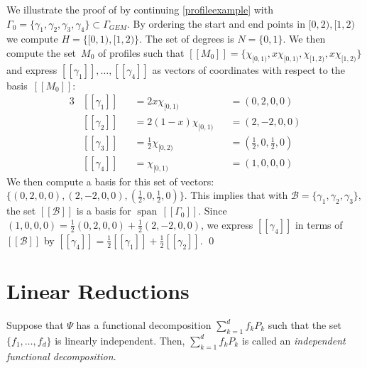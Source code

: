 \documentclass[a4paper,UKenglish,cleveref, autoref,mathscr]{lipics-v2019}
\newcommand{\1}{\mathbbm{1}}
\newcommand{\pl}{\Gamma_{\mathit{GEM}}}
\DeclareMathOperator{\Span}{span\,}
\begin{document}
\begin{example}\label{lineardecompexample}
We illustrate the proof of  by continuing \cref{profileexample} with $\Gamma_0 = \{\gamma_1, \gamma_2, \gamma_3, \gamma_4\} \subset \pl$.
By ordering the start and end points in $[0,2), [1,2)$ we compute $H = \{[0,1), [1,2)\}$.
The set of degrees is $N = \{0,1\}$.
We then compute the set~$M_0$ of profiles such that $[\![M_0]\!] = \{\chi_{[0,1)}, x\chi_{[0,1)},\chi_{[1,2)}, x\chi_{[1,2)}\}$
and express $[\![\gamma_1]\!], \dots, [\![\gamma_4]\!]$ as vectors of coordinates with respect to the basis~$[\![M_0]\!]$:
\begin{alignat*}{3}
&[\![\gamma_1]\!] && = 2x\chi_{[0,1)}      && = (0, 2, 0, 0) \\
&[\![\gamma_2]\!] && = 2(1-x)\chi_{[0,1)}  && = (2, -2, 0, 0) \\
&[\![\gamma_3]\!] && = \frac12\chi_{[0,2)} && = (\frac12, 0, \frac12, 0) \\
&[\![\gamma_4]\!] && = \chi_{[0,1)}        && = (1,0,0,0)
\end{alignat*}
We then compute a basis for this set of vectors: $\{(0, 2, 0, 0), (2, -2, 0, 0), (\frac12,0,\frac12,0)\}$. This implies that with $\mathcal{B} = \{\gamma_1, \gamma_2, \gamma_3\}$, the set $[\![\mathcal{B}]\!]$ is a basis for $\Span [\![\Gamma_0]\!]$.
Since $(1, 0, 0, 0) = \frac12(0, 2, 0, 0) + \frac12(2, -2, 0, 0)$, we express $[\![\gamma_4]\!]$ in terms of~$[\![\mathcal{B}]\!]$ by $[\![\gamma_4]\!] = \frac12 [\![\gamma_1]\!] + \frac12 [\![\gamma_2]\!]$.
\qed
\end{example}



\section{Linear Reductions}\label{starredsec}

Suppose that $\Psi$ has a functional decomposition $\sum_{k = 1}^d f_k P_k$ such that the set $\{f_1, \dots, f_d\}$ is linearly independent. Then, $\sum_{k = 1}^d f_k P_k$ is called an \emph{independent functional decomposition}.
\end{document}
